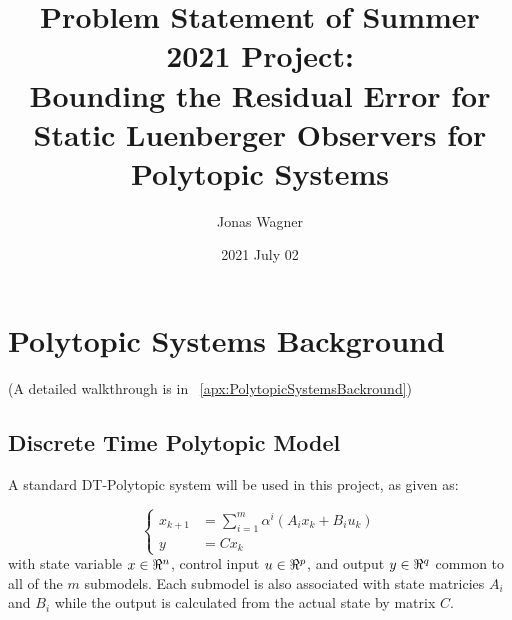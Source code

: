 \documentclass[]{article}
\title{Problem Statement of Summer 2021 Project:\\Bounding the Residual Error for Static Luenberger Observers for Polytopic Systems}
\author{Jonas Wagner}
\date{2021 July 02}
\begin{document}
\maketitle
%



%

%



\section{Polytopic Systems Background}
(A detailed walkthrough is in \appendixname \ \ref{apx:PolytopicSystemsBackround})

\subsection{Discrete Time Polytopic Model}
A standard DT-Polytopic system will be used in this project, as given as:

\begin{equation}\label{eq:DT_poly_sys_def}
	\begin{cases}
		x_{k+1} &= \sum_{i=1}^{m} \alpha^i (A_i x_k + B_i u_k)\\
		y		&= C x_k
	\end{cases}
\end{equation}
with state variable $x \in \real^n$, control input $u \in \real^p$, and output $y \in \real^q$ common to all of the $m$ submodels. Each submodel is also associated with state matricies $A_i$ and $B_i$ while the output is calculated from the actual state by matrix $C$.
\end{document}
